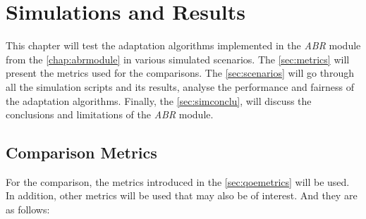 \chapter{Simulations and Results}
\label{chap:scenarios} 

This chapter will test the adaptation algorithms implemented in the \textit{ABR}
module from the \autoref{chap:abrmodule} in various simulated scenarios. The \autoref{sec:metrics}
will present the metrics used for the comparisons. The \autoref{sec:scenarios} will 
go through all the simulation scripts and its results,
analyse the performance and fairness of the adaptation algorithms. Finally, the \autoref{sec:simconclu},
will discuss the conclusions and limitations of the \textit{ABR} module.


\section{Comparison Metrics}
\label{sec:metrics}

For the comparison, the metrics introduced in the \autoref{sec:qoemetrics} will be used.
In addition, other metrics will be used that may also be of interest. And they are as follows:

